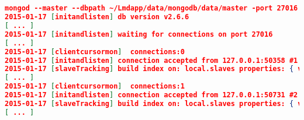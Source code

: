 \begin{lstlisting}[language=JSON, caption= Prompt renvoyé par le noeud maître]


mongod --master --dbpath ~/Lmdapp/data/mongodb/data/master -port 27016
2015-01-17 [initandlisten] db version v2.6.6
[ ... ]
2015-01-17 [initandlisten] waiting for connections on port 27016
[ ... ]
2015-01-17 [clientcursormon]  connections:0
2015-01-17 [initandlisten] connection accepted from 127.0.0.1:50358 #1 (1 connection now open)
2015-01-17 [slaveTracking] build index on: local.slaves properties: { v: 1, key: { _id: 1 }, name: "_id_", ns: "local.slaves" }
[ ... ]
2015-01-17 [clientcursormon]  connections:1
2015-01-17 [initandlisten] connection accepted from 127.0.0.1:50731 #2 (2 connections now open)
2015-01-17 [slaveTracking] build index on: local.slaves properties: { v: 2, key: { _id: 2 }, name: "_id_", ns: "local.slaves" }
[ ... ]

\end{lstlisting}
